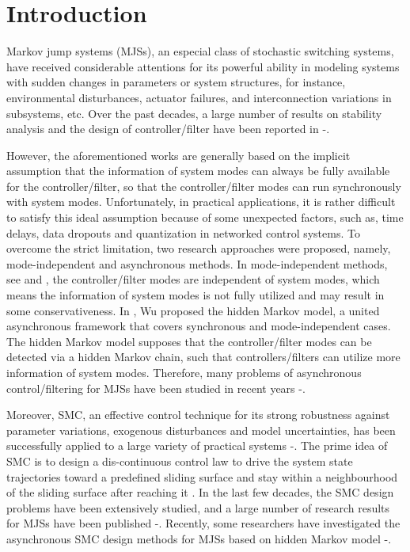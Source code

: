 \documentclass[conference]{IEEEtran}
\begin{document}
\section{Introduction}
	Markov jump systems (MJSs), an especial class of stochastic switching systems, have received considerable attentions for its powerful ability in modeling systems with sudden changes in parameters or system structures, for instance,  environmental disturbances, actuator failures, and interconnection variations in subsystems, etc. Over the past decades, a large number of results on stability analysis and the design of controller/filter have been reported in \cite{f1}-\cite{f5}.  
	
	However, the aforementioned works  are generally based on the implicit assumption that the information of system modes can always be  fully available for the controller/filter, so that the controller/filter modes can run synchronously with system modes. Unfortunately, in practical applications, it is rather difficult to satisfy this ideal assumption because of some unexpected factors, such as, time delays, data dropouts and quantization in networked control systems. To overcome the strict limitation, two research approaches were proposed, namely, mode-independent and asynchronous methods. In mode-independent methods, see \cite{mode_independent_T} and \cite{mode_independent_wuhuaining}, the controller/filter modes are independent of system modes, which means the information of system modes is not fully utilized and may result in some conservativeness. In \cite{passive_wu}, Wu proposed the hidden Markov model, a united asynchronous framework that covers synchronous and mode-independent cases. The hidden Markov model supposes that the controller/filter modes can be detected via a hidden Markov chain, such that controllers/filters can utilize more information of system modes.  Therefore, many problems of asynchronous control/filtering for MJSs have been studied in recent years \cite{Hinfty_shenying}-\cite{continus_filter_dongshanling}. 
	
	
	Moreover, SMC, an effective control technique for its strong robustness against parameter variations,  exogenous disturbances and model uncertainties, has been successfully applied to a large variety of practical systems \cite{smc-motor}-\cite{smc-robot}.  The prime idea of SMC is to design a dis-continuous control law to drive the system state trajectories toward a predefined sliding surface and stay within a neighbourhood of the  sliding surface after reaching it \cite{smc-book}. In the last few decades, the SMC design problems have been extensively studied, and a large number of  research results for MJSs have been published \cite{smc-semiMarkov}-\cite{smc-nonlinear}. Recently, some researchers have investigated the asynchronous SMC design methods for MJSs based on hidden Markov model \cite{songjun-smc}-\cite{smc-qi}. 
	
\end{document}
